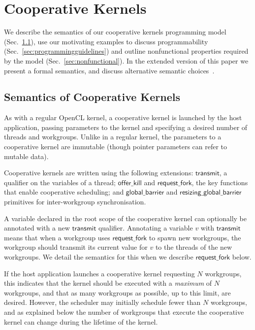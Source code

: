 \documentclass[sigconf]{acmart}
\newcommand{\mysec}{Sec.~}
\newcommand{\transmit}{\mathsf{transmit}}
\newcommand{\offerfork}{\mathsf{request\_fork}}
\newcommand{\offerkill}{\mathsf{offer\_kill}}
\newcommand{\globalbarrier}{\mathsf{global\_barrier}}
\newcommand{\resizingglobalbarrier}{\mathsf{resizing\_global\_barrier}}
\begin{document}
\section{Cooperative Kernels}\label{sec:cooperativekernels}

We describe the semantics of our cooperative kernels programming model
(\mysec\ref{sec:semantics}), use our motivating examples to discuss
programmability (\mysec\ref{sec:programmingguidelines}) and outline
nonfunctional properties required by the model (\mysec\ref{sec:nonfunctional}).
In the extended version of this paper we present a formal semantics, and discuss alternative semantic choices~\cite{ExtendedVersion}.
%

\subsection{Semantics of Cooperative Kernels}\label{sec:semantics}

As with a regular OpenCL kernel, a cooperative kernel is launched by
the host application, passing parameters to the kernel and specifying
a desired number of threads and workgroups. Unlike in a regular
kernel, the parameters to a cooperative kernel are immutable (though
pointer parameters can refer to mutable data).

Cooperative kernels are written using the following
extensions: $\transmit$, a qualifier on the variables of a
thread; $\offerkill$ and $\offerfork$, the key functions that enable
cooperative scheduling; and $\globalbarrier$ and $\resizingglobalbarrier$
primitives for inter-workgroup synchronisation.

%
A variable declared in the root scope of the cooperative kernel can
optionally be annotated with a new $\transmit$ qualifier.  Annotating
a variable $v$ with $\transmit$ means that when a workgroup
uses $\offerfork$ to spawn new
workgroups, the workgroup should transmit its
current value for $v$ to the threads of the new workgroups.
We detail the semantics for this when we
describe $\offerfork$ below.

%
If the host application launches a cooperative kernel requesting $N$
workgroups, this indicates that the kernel should be executed with a
\emph{maximum} of $N$ workgroups, and that as many workgroups as possible, up
to this limit, are desired.  However, the scheduler may initially
schedule fewer than $N$ workgroups, and as explained below the number
of workgroups that execute the cooperative kernel can change during
the lifetime of the kernel.
\end{document}
